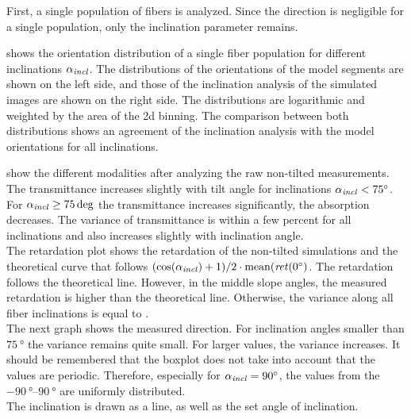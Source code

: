 % 
First, a single population of fibers is analyzed.
Since the direction is negligible for a single population, only the inclination parameter \modelInc{} remains.
\par
% 
 shows the orientation distribution of a single fiber population for different inclinations $\textnormal{$\alpha_{\mathit{incl}}$}{}$.
The distributions of the orientations of the model segments are shown on the left side, and those of the inclination analysis of the simulated images are shown on the right side.
The distributions are logarithmic and weighted by the area of the 2d binning.
The comparison between both distributions shows an agreement of the inclination analysis with the model orientations for all inclinations.
\par
% 
% 
% 
% 
 show the different modalities after analyzing the raw non-tilted measurements.
The transmittance increases slightly with tilt angle for inclinations $\textnormal{$\alpha_{\mathit{incl}}$}<\SI{75}{\degree}$.
For $\textnormal{$\alpha_{\mathit{incl}}$} \ge \SI{75}{\deg}$ the transmittance increases significantly, \ie{} the absorption decreases.
The variance of transmittance is within a few percent for all inclinations and also increases slightly with inclination angle.
\\
% 
The retardation plot shows the retardation of the non-tilted simulations and the theoretical curve that follows $(\cos(\textnormal{$\alpha_{\mathit{incl}}$}) + 1) / 2 \cdot \mathrm{mean}(\mathit{ret}(\SI{0}{\degree})$.
The retardation follows the theoretical line.
However, in the middle slope angles, the measured retardation is higher than the theoretical line.
Otherwise, the variance along all fiber inclinations is equal to \modelInc{}.
\\
% 
The next graph shows the measured direction.
For inclination angles smaller than $\SI{75}{\degree}$ the variance remains quite small.
For larger values, the variance increases.
It should be remembered that the boxplot does not take into account that the values are periodic.
Therefore, especially for $\textnormal{$\alpha_{\mathit{incl}}$}=\SI{90}{\degree}$, the values from the $\SIrange{-90}{90}{\degree}$ are uniformly distributed.
\\
% 
The inclination is drawn as a line, as well as the set angle of inclination.
